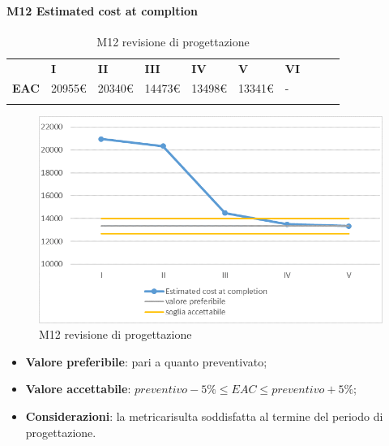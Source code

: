 \paragraph{M12 Estimated cost at compltion} \mbox{}
\begin{longtable}[H!] {						
		>{}p{38mm}  		
		>{}p{12mm}
		>{}p{12mm}		
		>{}p{12mm}		
		>{}p{12mm}		
		>{}p{12mm}		
		>{}p{12mm}
		>{}p{12mm}
		>{}p{12mm}
		>{}p{12mm}
	}
	\rowcolor{gray!50}
	\textbf{} & \textbf{I} & \textbf{II} & \textbf{III} & \textbf{IV} & \textbf{V} & \textbf{VI} \TBstrut \\ [2mm]
	\textbf{EAC} & 20955\euro & 20340\euro & 14473\euro & 13498\euro & 13341\euro & - \TBstrut \\ [2mm]
	\rowcolor{white}
	\caption{M12 revisione di progettazione\glo}
\end{longtable}
\begin{figure}[H] 	
\includegraphics[width=\linewidth]{./img/grafici/RP9.png}	
\caption{M12 revisione di progettazione\glo}	
\end{figure}
\begin{itemize}
	\item \textbf{Valore preferibile}: pari a quanto preventivato;
	\item \textbf{Valore accettabile}: $preventivo-5\% \le EAC \le preventivo+5\%$;
	\item \textbf{Considerazioni}: la metrica\glosp risulta soddisfatta al termine del periodo di progettazione\glo.
\end{itemize}
